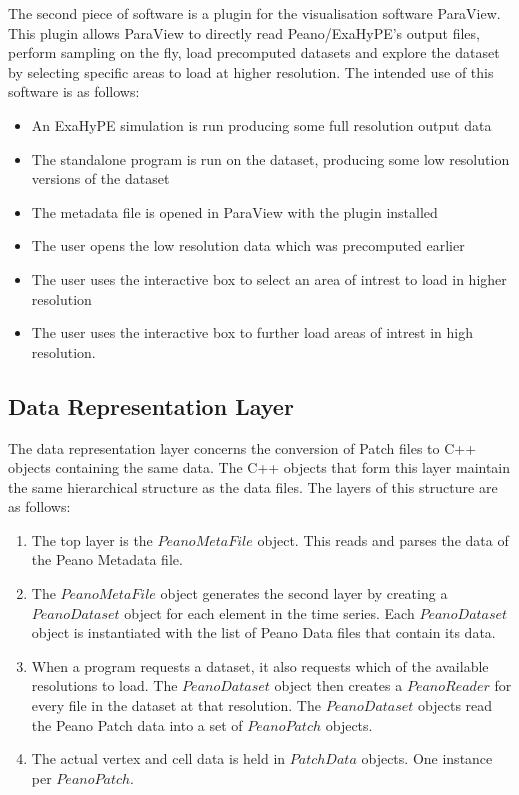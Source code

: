 \documentclass[12pt,a4paper]{article}
\begin{document}
The second piece of software is a plugin for the visualisation software ParaView. This plugin allows ParaView to directly read Peano/ExaHyPE's output files, perform sampling on the fly, load precomputed datasets and explore the dataset by selecting specific areas to load at higher resolution. The intended use of this software is as follows:

\begin{itemize}
\item An ExaHyPE simulation is run producing some full resolution output data
\item The standalone program is run on the dataset, producing some low resolution versions of the dataset
\item The metadata file is opened in ParaView with the plugin installed
\item The user opens the low resolution data which was precomputed earlier
\item The user uses the interactive box to select an  area of intrest to load in higher resolution
\item The user uses the interactive box to further load areas of intrest in high resolution.
\end{itemize}

\subsection{Data Representation Layer}


The data representation layer concerns the conversion of Patch files to C++ objects containing the same data. The C++ objects that form this layer maintain the same hierarchical structure as the data files. The layers of this structure are as follows:

\begin{enumerate}
\item The top layer is the $PeanoMetaFile$ object. This reads and parses the data of the Peano Metadata file.

\item The $PeanoMetaFile$ object generates the second layer by creating a $PeanoDataset$ object for each element in the time series. Each $PeanoDataset$ object is instantiated with the list of Peano Data files that contain its data.

\item When a program requests a dataset, it also requests which of the available resolutions to load. The $PeanoDataset$ object then creates a $PeanoReader$ for every file in the dataset at that resolution. The $PeanoDataset$ objects read the Peano Patch data into a set of $PeanoPatch$ objects.

\item The actual vertex and cell data is held in $PatchData$ objects. One instance per $PeanoPatch$.
\end{enumerate}
\end{document}
